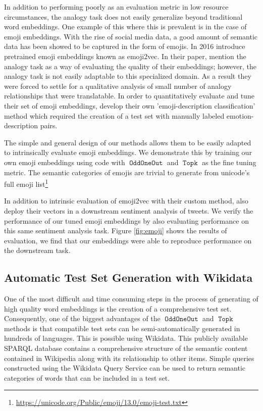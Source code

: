 \documentclass[11pt,a4paper]{article}
\DeclareMathOperator{\OddOneOut}{\texttt{OddOneOut}}
\DeclareMathOperator{\topk}{\texttt{Topk}}
\begin{document}
In addition to performing poorly as an evaluation metric in low resource circumstances,
the analogy task does not easily generalize beyond traditional word embeddings.
One example of this where this is prevalent is in the case of emoji embeddings.
With the rise of social media data, a good amount of semantic data has been showed to be captured in the form of emojis. 
In 2016 \cite{eisner2016emoji2vec} introduce pretrained emoji embeddings known as emoji2vec. 
In their paper, \cite{eisner2016emoji2vec} mention the analogy task as a way of evaluating the quality of their embeddings;
 however, the analogy task is not easily adaptable to this specialized domain.
 As a result they were forced to settle for a qualitative analysis of small number of analogy relationships that were translatable.
 In order to quantitatively evaluate and tune their set of emoji embeddings, \cite{eisner2016emoji2vec} develop their own 'emoji-description classification' method  which required the creation of a test set with manually labeled emotion-description pairs.

The simple and general design of our methods allows them to be easily adapted to intrinsically evaluate emoji embeddings.
We demonstrate this by training our own emoji embeddings using \cite{eisner2016emoji2vec} code with $\OddOneOut$ and $\topk$ as the fine tuning metric.
The semantic categories of emojis are trivial to generate from unicode's full emoji list\footnote{\url{https://unicode.org/Public/emoji/13.0/emoji-test.txt}} 

In addition to intrinsic evaluation of emoji2vec with their custom method, \cite{eisner2016emoji2vec} also deploy their vectors in a downstream sentiment analysis of tweets.
We verify the performance of our tuned emoji embeddings by also evaluating performance on this same sentiment analysis task.
Figure \ref{fig:emoji} shows the results of evaluation, we find that our embeddings were able to reproduce \cite{eisner2016emoji2vec} performance on the downstream task.

\subsection{Automatic Test Set Generation with Wikidata}

One of the most difficult and time consuming steps in the process of generating of high quality word embeddings is the creation of a comprehensive test set.
 Consequently, one of the biggest advantages of the $\OddOneOut$ and $\topk$ methods is that compatible test sets can be semi-automatically generated in hundreds of languages.
This is possible using Wikidata. 
This publicly available SPARQL database contains a comprehensive structure of the semantic content contained in Wikipedia
along with its relationship to other items.
Simple queries constructed using the Wikidata Query Service can be used to return semantic categories of words that can be included in a test set.
\end{document}
